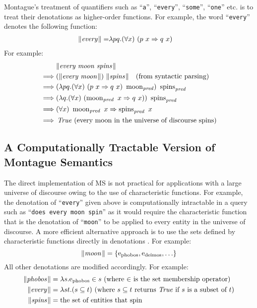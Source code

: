 \documentclass[../main.tex]{subfiles}
\begin{document}
\begin{refsection}
Montague's treatment of quantifiers such as ``\texttt{a}'', ``\texttt{every}'', ``\texttt{some}'', ``\texttt{one}'' etc. is to treat their
denotations as higher-order functions. For example, the word ``\texttt{every}'' denotes the following function:
\begin{align*}
	\lVert\textit{every\hspace{0.1em}}\rVert =& \lambda pq.(\forall x) \  (p \  x \Rightarrow q \  x)
\end{align*}
For example:
\begin{equation*}
	\begin{split}
		& \lVert\textit{every moon spins\hspace{0.1em}}\rVert \\
		\implies&  (\lVert\textit{every moon\hspace{0.1em}}\rVert) \  \lVert\textit{spins\hspace{0.1em}}\rVert \quad(\text{from syntactic parsing}) \\
		\implies&  (\lambda pq.(\forall x)\ (p \  x \Rightarrow q \  x) \  \operatorname{\operatorname{moon}}_{\operatorname{\mathit{pred}}}) \  \operatorname{\operatorname{spins}}_{\operatorname{\mathit{pred}}} \\
		\implies&  (\lambda q.(\forall x)\  (\operatorname{\operatorname{moon}}_{\operatorname{\mathit{pred}}} \   x \Rightarrow q \   x)) \  \operatorname{spins}_{\operatorname{\mathit{pred}}} \\
		\implies&  (\forall x)\  \operatorname{\operatorname{moon}}_{\operatorname{\mathit{pred}}} \ x \Rightarrow \operatorname{spins}_{\operatorname{\mathit{pred}}} \   x \\
		\implies&  \operatorname{\mathit{True}}\ (\text{every moon in the universe of discourse spins})
	\end{split}
\end{equation*}
\subsection{A Computationally Tractable Version of Montague Semantics} %
\label{icsc2020conf:frostmont}
The direct implementation of MS is not practical for applications with a large universe of discourse
owing to the use of characteristic functions. For example, the denotation of ``\texttt{every}'' given above is
computationally intractable in a query such as ``\texttt{does every moon spin}'' as it would require the
characteristic function that is the denotation of ``\texttt{moon}'' to be applied to every entity in the universe of
discourse. A more efficient alternative approach is to use the sets defined by characteristic functions
directly in denotations \cite{frost1989constructing, frost2002efficient}. For example:
\[ \lVert\textit{moon\hspace{0.1em}}\rVert = \{\mathrm{e}_{\operatorname{\operatorname{phobos}}} , \mathrm{e}_{\operatorname{\operatorname{deimos}}}, \ldots\} \]
All other denotations are modified accordingly. For example:
\begin{align*}
	\meaningof{phobos} &= \lambda s.\entityassoc{\phobos} \in s\ \dmathrm{(where $\in$ is the set membership operator)} \\
	\meaningof{every} &= \lambda st.(s \subseteq t)\ \dmathrm{(where $s \subseteq t$ returns $\True$ if $s$ is a subset of $t$)} \\
	\meaningof{spins} &= \dmathrm{the set of entities that spin}
\end{align*}


\end{refsection}
\end{document}

